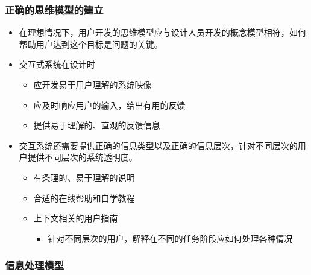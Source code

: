 \documentclass{beamer}
\begin{document}
\begin{frame}
	\frametitle{正确的思维模型的建立}
	\beamertemplatetransparentcovereddynamicmedium
	\transwipe
	\begin{itemize}
		\item 在理想情况下，用户开发的思维模型应与设计人员开发的概念模型相符，如何帮助用户达到这个目标是问题的关键。\pause
		\item 交互式系统在设计时
		\begin{itemize}
			\item 应开发易于用户理解的系统映像
			\item 应及时响应用户的输入，给出有用的反馈
			\item 提供易于理解的、直观的反馈信息
		\end{itemize}\pause
		\item 交互系统还需要提供正确的信息类型以及正确的信息层次，针对不同层次的用户提供不同层次的系统透明度。
		\begin{itemize}
			\item 有条理的、易于理解的说明 
			\item 合适的在线帮助和自学教程
			\item 上下文相关的用户指南
			\begin{itemize}
				\item 针对不同层次的用户，解释在不同的任务阶段应如何处理各种情况
			\end{itemize}
		\end{itemize}
	\end{itemize}
\end{frame}

\begin{frame}
	\frametitle{信息处理模型}
	\beamertemplatetransparentcovereddynamicmedium
	\transdissolve
	\begin{columns}
		\column{6cm}
		\begin{itemize}
			\begin{itemize}
			\end{itemize}
		\end{itemize}
		\column{4cm}
	\end{columns}
\end{frame}
\end{document}
